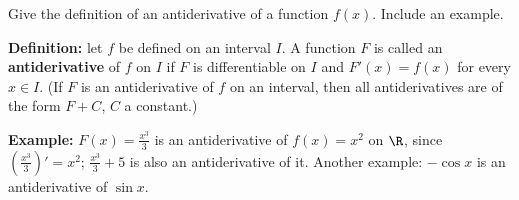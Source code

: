 
\begin{question}
Give the definition of an antiderivative of a function $f(x)$. Include an example.
\end{question}

\begin{solution}
\textbf{Definition:} let $f$ be defined on an interval $I$. A function $F$ is called an \textbf{antiderivative} of $f$ on $I$ if $F$ is differentiable on $I$ and $F'(x)=f(x)$ for every $x\in I$.
(If $F$ is an antiderivative of $f$ on an interval, then all antiderivatives are of the form $F+C$, $C$ a constant.)

\textbf{Example:} $F(x)=\frac{x^3}{3}$ is an antiderivative of $f(x)=x^2$ on $\R$, since $\left(\frac{x^3}{3}\right)'=x^2$; $\frac{x^3}{3}+5$ is also an antiderivative of it. Another example: $-\cos x$ is an antiderivative of $\sin x$.
\end{solution}
